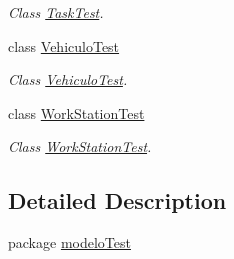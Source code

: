 \begin{DoxyCompactItemize}
\begin{DoxyCompactList}\small\item\em Class \mbox{\hyperlink{classmodelo_test_1_1_task_test}{Task\+Test}}. \end{DoxyCompactList}\item 
class \mbox{\hyperlink{classmodelo_test_1_1_vehiculo_test}{Vehiculo\+Test}}
\begin{DoxyCompactList}\small\item\em Class \mbox{\hyperlink{classmodelo_test_1_1_vehiculo_test}{Vehiculo\+Test}}. \end{DoxyCompactList}\item 
class \mbox{\hyperlink{classmodelo_test_1_1_work_station_test}{Work\+Station\+Test}}
\begin{DoxyCompactList}\small\item\em Class \mbox{\hyperlink{classmodelo_test_1_1_work_station_test}{Work\+Station\+Test}}. \end{DoxyCompactList}\end{DoxyCompactItemize}


\subsection{Detailed Description}
package \mbox{\hyperlink{namespacemodelo_test}{modelo\+Test}} 